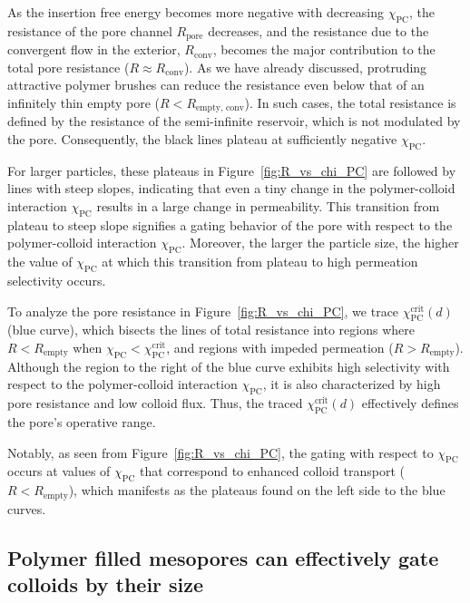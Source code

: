 \documentclass[12pt, a4paper]{article}
\begin{document}
As the insertion free energy becomes more negative with decreasing $\chi_{\textrm{PC}}$, the resistance of the pore channel $R_{\textrm{pore}}$ decreases, and the resistance due to the convergent flow in the exterior, $R_{\textrm{conv}}$, becomes the major contribution to the total pore resistance ($R \approx R_{\textrm{conv}}$).
As we have already discussed, protruding attractive polymer brushes can reduce the resistance even below that of an infinitely thin empty pore ($R < R_{\textrm{empty, conv}}$).
In such cases, the total resistance is defined by the resistance of the semi-infinite reservoir, which is not modulated by the pore.
Consequently, the black lines plateau at sufficiently negative $\chi_{\textrm{PC}}$.

For larger particles, these plateaus in Figure~\ref{fig:R_vs_chi_PC} are followed by lines with steep slopes, indicating that even a tiny change in the polymer-colloid interaction $\chi_{\textrm{PC}}$ results in a large change in permeability.
This transition from plateau to steep slope signifies a gating behavior of the pore with respect to the polymer-colloid interaction $\chi_{\textrm{PC}}$.
Moreover, the larger the particle size, the higher the value of $\chi_{\textrm{PC}}$ at which this transition from plateau to high permeation selectivity occurs.

To analyze the pore resistance in Figure~\ref{fig:R_vs_chi_PC}, we trace $\chi_{\textrm{PC}}^{\textrm{crit}}(d)$ (blue curve), which bisects the lines of total resistance into regions where $R < R_{\textrm{empty}}$ when $\chi_{\textrm{PC}} < \chi_{\textrm{PC}}^{\textrm{crit}}$, and regions with impeded permeation ($R > R_{\textrm{empty}}$).
Although the region to the right of the blue curve exhibits high selectivity with respect to the polymer-colloid interaction $\chi_{\textrm{PC}}$, it is also characterized by high pore resistance and low colloid flux.
Thus, the traced $\chi_{\textrm{PC}}^{\textrm{crit}}(d)$ effectively defines the pore's operative range.

Notably, as seen from Figure~\ref{fig:R_vs_chi_PC}, the gating with respect to $\chi_{\textrm{PC}}$ occurs at values of $\chi_{\textrm{PC}}$ that correspond to enhanced colloid transport ($R < R_{\textrm{empty}}$), which manifests as the plateaus found on the left side to the blue curves.

\subsection{Polymer filled mesopores can effectively gate colloids by their size}
\end{document}
